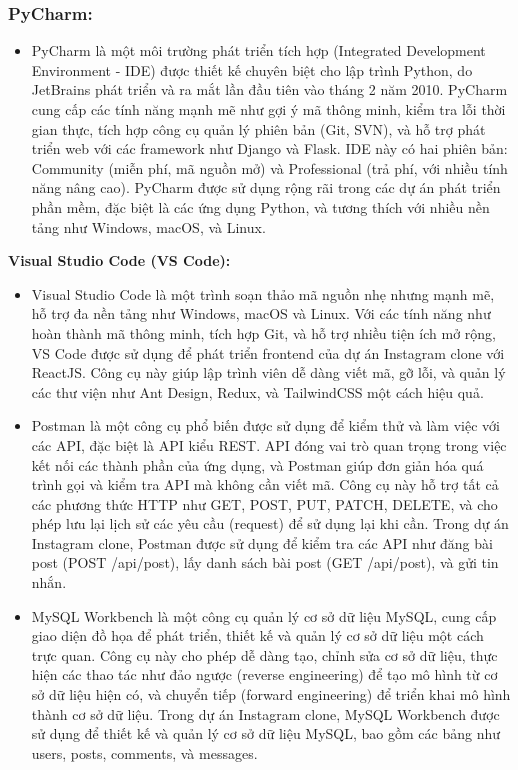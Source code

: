 \subsubsection{PyCharm:}
\begin{itemize}
    \item PyCharm là một môi trường phát triển tích hợp (Integrated Development Environment - IDE) được thiết kế chuyên biệt cho lập trình Python, do JetBrains phát triển và ra mắt lần đầu tiên vào tháng 2 năm 2010. PyCharm cung cấp các tính năng mạnh mẽ như gợi ý mã thông minh, kiểm tra lỗi thời gian thực, tích hợp công cụ quản lý phiên bản (Git, SVN), và hỗ trợ phát triển web với các framework như Django và Flask. IDE này có hai phiên bản: Community (miễn phí, mã nguồn mở) và Professional (trả phí, với nhiều tính năng nâng cao). PyCharm được sử dụng rộng rãi trong các dự án phát triển phần mềm, đặc biệt là các ứng dụng Python, và tương thích với nhiều nền tảng như Windows, macOS, và Linux.
\end{itemize}

{\normalsize \textbf{Visual Studio Code (VS Code):}}
\begin{itemize}
\item Visual Studio Code là một trình soạn thảo mã nguồn nhẹ nhưng mạnh mẽ, hỗ trợ đa nền tảng như Windows, macOS và Linux. Với các tính năng như hoàn thành mã thông minh, tích hợp Git, và hỗ trợ nhiều tiện ích mở rộng, VS Code được sử dụng để phát triển frontend của dự án Instagram clone với ReactJS. Công cụ này giúp lập trình viên dễ dàng viết mã, gỡ lỗi, và quản lý các thư viện như Ant Design, Redux, và TailwindCSS một cách hiệu quả.
\end{itemize}

\begin{itemize}
\item Postman là một công cụ phổ biến được sử dụng để kiểm thử và làm việc với các API, đặc biệt là API kiểu REST. API đóng vai trò quan trọng trong việc kết nối các thành phần của ứng dụng, và Postman giúp đơn giản hóa quá trình gọi và kiểm tra API mà không cần viết mã. Công cụ này hỗ trợ tất cả các phương thức HTTP như GET, POST, PUT, PATCH, DELETE, và cho phép lưu lại lịch sử các yêu cầu (request) để sử dụng lại khi cần. Trong dự án Instagram clone, Postman được sử dụng để kiểm tra các API như đăng bài post (POST /api/post), lấy danh sách bài post (GET /api/post), và gửi tin nhắn.
\end{itemize}

\begin{itemize}
\item MySQL Workbench là một công cụ quản lý cơ sở dữ liệu MySQL, cung cấp giao diện đồ họa để phát triển, thiết kế và quản lý cơ sở dữ liệu một cách trực quan. Công cụ này cho phép dễ dàng tạo, chỉnh sửa cơ sở dữ liệu, thực hiện các thao tác như đảo ngược (reverse engineering) để tạo mô hình từ cơ sở dữ liệu hiện có, và chuyển tiếp (forward engineering) để triển khai mô hình thành cơ sở dữ liệu. Trong dự án Instagram clone, MySQL Workbench được sử dụng để thiết kế và quản lý cơ sở dữ liệu MySQL, bao gồm các bảng như users, posts, comments, và messages.
\end{itemize}

